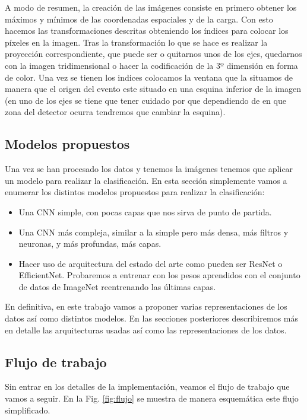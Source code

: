\documentclass[a4paper,12pt,twoside,titlepage]{article}
\newcommand{\red}[1]{\textcolor{red}{#1}}
\begin{document}
A modo de resumen, la creación de las imágenes consiste en primero obtener los máximos y mínimos de las coordenadas espaciales y de la carga. Con esto hacemos las transformaciones descritas obteniendo los índices para colocar los píxeles en la imagen. Tras la transformación lo que se hace es realizar la proyección correspondiente, que puede ser o quitarnos unos de los ejes, quedarnos con la imagen tridimensional o hacer la codificación de la 3º dimensión en forma de color. Una vez se tienen los indices colocamos la ventana que la situamos de manera que el origen del evento este situado en una esquina inferior de la imagen (en uno de los ejes se tiene que tener cuidado por que dependiendo de en que zona del detector ocurra tendremos que cambiar la esquina).

\subsection{Modelos propuestos}

Una vez se han procesado los datos y tenemos la imágenes tenemos que aplicar un modelo para realizar la clasificación. En esta sección simplemente vamos a enumerar los distintos modelos propuestos para realizar la clasificación:

\begin{itemize}
  \item Una CNN simple, con pocas capas que nos sirva de punto de partida.
  \item Una CNN más compleja, similar a la simple pero más densa, más filtros y neuronas, y más profundas, más capas.
  \item Hacer uso de arquitectura del estado del arte como pueden ser ResNet o EfficientNet. Probaremos a entrenar con los pesos aprendidos con el conjunto de datos de ImageNet reentrenando las últimas capas.
\end{itemize}

En definitiva, en este trabajo vamos a proponer varias representaciones de los datos así como distintos modelos. En las secciones posteriores describiremos más en detalle las arquitecturas usadas así como las representaciones de los datos.

\subsection{Flujo de trabajo}

Sin entrar en los detalles de la implementación, veamos el flujo de trabajo que vamos a seguir. En la Fig. \ref{fig:flujo} se muestra de manera esquemática este flujo simplificado.
\end{document}
